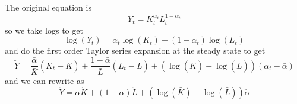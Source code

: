 \documentclass[11pt]{amsart}
\begin{document}
\subsection{}
The original equation is
\[
Y_t = K_t^{\alpha_t} L_t^{1-\alpha_t}
\]
so we take logs to get
\[
\log(Y_t) = \alpha_t \log(K_t) + (1-\alpha_t) \log(L_t)
\]
and do the first order Taylor series expansion at the steady state to get
\[
\check{Y} =  \frac{\bar{\alpha} }{\bar{K}} (K_t - \bar{K}) + \frac{1-\bar{\alpha} }{\bar{L}} (L_t - \bar{L}) + (\log(\bar{K}) - \log(\bar{L})) (\alpha_t - \bar{\alpha})
\]
and we can rewrite as
\[
\check{Y} = \bar{\alpha} \check{K} + (1-\bar{\alpha}) \check{L} + (\log(\bar{K}) - \log(\bar{L})) \check{\alpha}
\]
\end{document}
